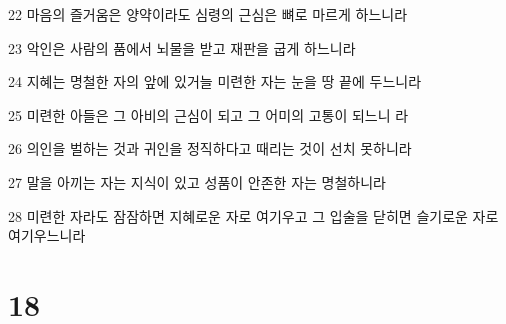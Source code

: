 \par 22 마음의 즐거움은 양약이라도 심령의 근심은 뼈로 마르게 하느니라
\par 23 악인은 사람의 품에서 뇌물을 받고 재판을 굽게 하느니라
\par 24 지혜는 명철한 자의 앞에 있거늘 미련한 자는 눈을 땅 끝에 두느니라
\par 25 미련한 아들은 그 아비의 근심이 되고 그 어미의 고통이 되느니 라
\par 26 의인을 벌하는 것과 귀인을 정직하다고 때리는 것이 선치 못하니라
\par 27 말을 아끼는 자는 지식이 있고 성품이 안존한 자는 명철하니라
\par 28 미련한 자라도 잠잠하면 지혜로운 자로 여기우고 그 입술을 닫히면 슬기로운 자로 여기우느니라

\chapter{18}

